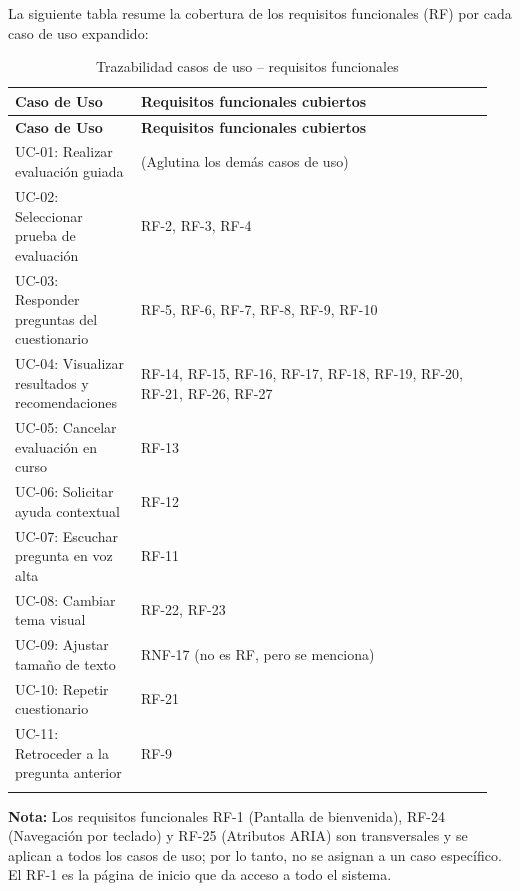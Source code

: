 La siguiente tabla resume la cobertura de los requisitos funcionales (RF) por cada caso de uso expandido:

\begin{longtable}{p{0.25\linewidth} p{0.70\linewidth}}
\toprule
\rowcolor{tableheader!20}
\textbf{Caso de Uso} & \textbf{Requisitos funcionales cubiertos} \\
\midrule
\endfirsthead
\rowcolor{tableheader!20}
\textbf{Caso de Uso} & \textbf{Requisitos funcionales cubiertos} \\
\midrule
\endhead
\bottomrule
\endfoot
UC-01: Realizar evaluación guiada & (Aglutina los demás casos de uso) \\
UC-02: Seleccionar prueba de evaluación & RF-2, RF-3, RF-4 \\
UC-03: Responder preguntas del cuestionario & RF-5, RF-6, RF-7, RF-8, RF-9, RF-10 \\
UC-04: Visualizar resultados y recomendaciones & RF-14, RF-15, RF-16, RF-17, RF-18, RF-19, RF-20, RF-21, RF-26, RF-27 \\
UC-05: Cancelar evaluación en curso & RF-13 \\
UC-06: Solicitar ayuda contextual & RF-12 \\
UC-07: Escuchar pregunta en voz alta & RF-11 \\
UC-08: Cambiar tema visual & RF-22, RF-23 \\
UC-09: Ajustar tamaño de texto & RNF-17 (no es RF, pero se menciona) \\
UC-10: Repetir cuestionario & RF-21 \\
UC-11: Retroceder a la pregunta anterior & RF-9 \\
\bottomrule
\caption{Trazabilidad casos de uso -- requisitos funcionales}
\label{tab:trazabilidad}
\end{longtable}

\textbf{Nota:} Los requisitos funcionales RF-1 (Pantalla de bienvenida), RF-24 (Navegación por teclado) y RF-25 (Atributos ARIA) son transversales y se aplican a todos los casos de uso; por lo tanto, no se asignan a un caso específico. El RF-1 es la página de inicio que da acceso a todo el sistema.